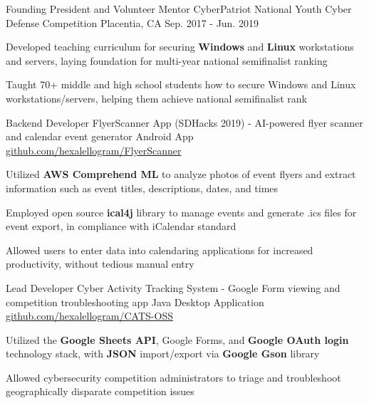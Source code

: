 \begin{cventries}
  \cventry
    {Founding President and Volunteer Mentor} %
    {CyberPatriot National Youth Cyber Defense Competition} %
    {Placentia, CA} %
    {Sep. 2017 - Jun. 2019} %
    {
      \begin{cvitems} %
        \item {Developed teaching curriculum for securing \textbf{Windows} and \textbf{Linux} workstations and servers, laying foundation for multi-year national semifinalist ranking}
        \item {Taught 70+ middle and high school students how to secure Windows and Linux workstations/servers, helping them achieve national semifinalist rank}
      \end{cvitems}
    }

\cventry
{Backend Developer} %
{FlyerScanner App (SDHacks 2019) - AI-powered flyer scanner and calendar event generator} %
{Android App} %
{\href{https://github.com/hexalellogram/FlyerScanner}{github.com/hexalellogram/FlyerScanner}} %
{
  \begin{cvitems} %
    \item {Utilized \textbf{AWS Comprehend ML} to analyze photos of event flyers and extract information such as event titles, descriptions, dates, and times}
    \item {Employed open source \textbf{ical4j} library to manage events and generate .ics files for event export, in compliance with iCalendar standard}
    \item {Allowed users to enter data into calendaring applications for increased productivity, without tedious manual entry}
  \end{cvitems}
}

\cventry
{Lead Developer} %
{Cyber Activity Tracking System - Google Form viewing and competition troubleshooting app} %
{Java Desktop Application} %
{\href{https://github.com/hexalellogram/CATS-OSS}{github.com/hexalellogram/CATS-OSS}} %
{
  \begin{cvitems} %
    \item {Utilized the \textbf{Google Sheets API}, Google Forms, and \textbf{Google OAuth login} technology stack, with \textbf{JSON} import/export via \textbf{Google Gson} library}
    \item {Allowed cybersecurity competition administrators to triage and troubleshoot geographically disparate competition issues}
  \end{cvitems}
}

\end{cventries}
